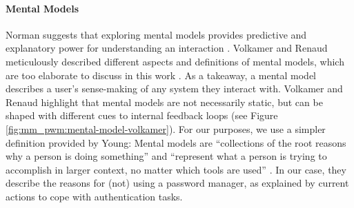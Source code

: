 

\paragraph{Mental Models} 
Norman suggests that exploring mental models provides predictive and explanatory power for understanding an interaction \cite{Norman1982ObservationsMentalModels}. Volkamer and Renaud meticulously described different aspects and definitions of mental models, which are too elaborate to discuss in this work \cite{Volkamer2013MentalModels}. As a takeaway, a mental model describes a user's sense-making of any system they interact with. Volkamer and Renaud highlight that mental models are not necessarily static, but can be shaped with different cues to internal feedback loops (see Figure \ref{fig:mm_pwm:mental-model-volkamer}). For our purposes, we use a simpler definition provided by Young: Mental models are ``collections of the root reasons why a person is doing something'' and ``represent what a person is trying to accomplish in larger context, no matter which tools are used''  \cite[p.11]{Young2008}. In our case, they describe the reasons for (not) using a password manager, as explained by current actions to cope with authentication tasks. 

